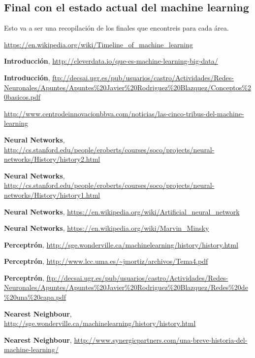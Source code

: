 \documentclass[a4paper, 11pt]{article} %
\begin{document}
\subsection{Final con el estado actual del machine learning}
Esto va a ser una recopilación de los finales que encontreis para cada área.
\begin{thebibliography}{9}

 \url{https://en.wikipedia.org/wiki/Timeline_of_machine_learning}

 	\textbf{Introducción},
 \url{http://cleverdata.io/que-es-machine-learning-big-data/}
 
 	\textbf{Introducción},
 \url{ftp://decsai.ugr.es/pub/usuarios/castro/Actividades/Redes-Neuronales/Apuntes/Apuntes%20Javier%20Rodriguez%20Blazquez/Conceptos%20basicos.pdf}

\url{http://www.centrodeinnovacionbbva.com/noticias/las-cinco-tribus-del-machine-learning}

	\textbf{Neural Networks},
  \url{http://cs.stanford.edu/people/eroberts/courses/soco/projects/neural-networks/History/history2.html}
 
 	\textbf{Neural Networks},
 \url{http://cs.stanford.edu/people/eroberts/courses/soco/projects/neural-networks/History/history1.html}
 
 	\textbf{Neural Networks},
 \url{https://en.wikipedia.org/wiki/Artificial_neural_network}
 
 	\textbf{Neural Networks},
 \url{https://en.wikipedia.org/wiki/Marvin_Minsky}
 
 	\textbf{Perceptrón},
 \url{http://sge.wonderville.ca/machinelearning/history/history.html}
 
 	\textbf{Perceptrón},
 \url{http://www.lcc.uma.es/~jmortiz/archivos/Tema4.pdf}
 
 	\textbf{Perceptrón},
 \url{ftp://decsai.ugr.es/pub/usuarios/castro/Actividades/Redes-Neuronales/Apuntes/Apuntes%20Javier%20Rodriguez%20Blazquez/Redes%20de%20una%20capa.pdf}
 
 	\textbf{Nearest Neighbour},
 \url{http://sge.wonderville.ca/machinelearning/history/history.html}
 
 	\textbf{Nearest Neighbour},
 \url{http://www.synergicpartners.com/una-breve-historia-del-machine-learning/}
 

\end{thebibliography}
\end{document}
